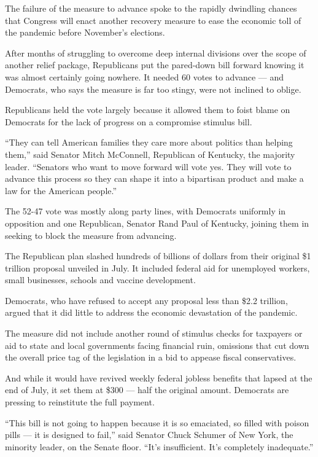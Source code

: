 The failure of the measure to advance spoke to the rapidly dwindling
chances that Congress will enact another recovery measure to ease the
economic toll of the pandemic before November's elections.

After months of struggling to overcome deep internal divisions over the
scope of another relief package, Republicans put the pared-down bill
forward knowing it was almost certainly going nowhere. It needed 60
votes to advance --- and Democrats, who says the measure is far too
stingy, were not inclined to oblige.

Republicans held the vote largely because it allowed them to foist blame
on Democrats for the lack of progress on a compromise stimulus bill.

``They can tell American families they care more about politics than
helping them,'' said Senator Mitch McConnell, Republican of Kentucky,
the majority leader. ``Senators who want to move forward will vote yes.
They will vote to advance this process so they can shape it into a
bipartisan product and make a law for the American people.''

The 52-47 vote was mostly along party lines, with Democrats uniformly in
opposition and one Republican, Senator Rand Paul of Kentucky, joining
them in seeking to block the measure from advancing.

The Republican plan slashed hundreds of billions of dollars from their
original \$1 trillion proposal unveiled in July. It included federal aid
for unemployed workers, small businesses, schools and vaccine
development.

Democrats, who have refused to accept any proposal less than \$2.2
trillion, argued that it did little to address the economic devastation
of the pandemic.

The measure did not include another round of stimulus checks for
taxpayers or aid to state and local governments facing financial ruin,
omissions that cut down the overall price tag of the legislation in a
bid to appease fiscal conservatives.

And while it would have revived weekly federal jobless benefits that
lapsed at the end of July, it set them at \$300 --- half the original
amount. Democrats are pressing to reinstitute the full payment.

``This bill is not going to happen because it is so emaciated, so filled
with poison pills --- it is designed to fail,'' said Senator Chuck
Schumer of New York, the minority leader, on the Senate floor. ``It's
insufficient. It's completely inadequate.''

